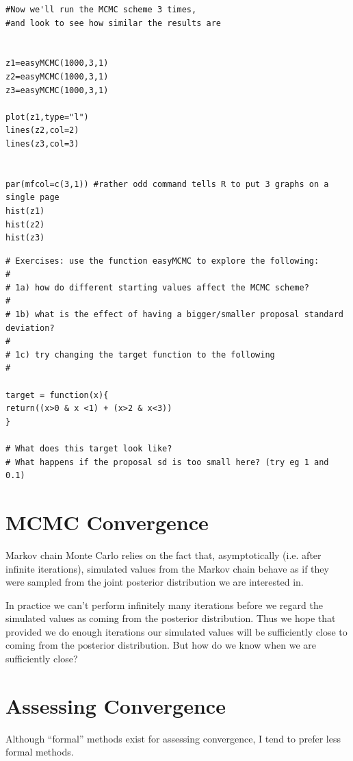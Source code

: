 \begin{verbatim}
#Now we'll run the MCMC scheme 3 times, 
#and look to see how similar the results are


z1=easyMCMC(1000,3,1)
z2=easyMCMC(1000,3,1)
z3=easyMCMC(1000,3,1)

plot(z1,type="l")
lines(z2,col=2)
lines(z3,col=3)


par(mfcol=c(3,1)) #rather odd command tells R to put 3 graphs on a single page
hist(z1)
hist(z2)
hist(z3)

\end{verbatim}
\es\bs

\begin{verbatim}
# Exercises: use the function easyMCMC to explore the following:
#
# 1a) how do different starting values affect the MCMC scheme?  
#
# 1b) what is the effect of having a bigger/smaller proposal standard deviation?
#
# 1c) try changing the target function to the following
#

target = function(x){
return((x>0 & x <1) + (x>2 & x<3))
}

# What does this target look like?
# What happens if the proposal sd is too small here? (try eg 1 and 0.1)

\end{verbatim}
\es\bs


\section*{\hfil MCMC Convergence \hfil}

Markov chain Monte Carlo relies on the fact that, asymptotically (i.e. after
infinite iterations),
simulated values from the Markov chain behave as if they were
sampled from the joint posterior distribution we are interested
in.

In practice we can't perform infinitely many iterations before we
regard the simulated values as coming from the posterior
distribution. Thus we hope that provided we do enough iterations our
simulated values will be sufficiently close to coming from the
posterior distribution. But how do we know when we are
sufficiently close?

\es\bs
\section*{Assessing Convergence}

Although ``formal'' methods exist for assessing convergence,
I tend to prefer less formal methods.

